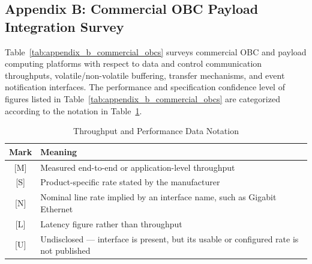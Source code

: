 \documentclass[10pt]{../datasheet}
\begin{document}
\begin{landscape}
  \section{Appendix B: Commercial OBC Payload Integration Survey}
  \makeatletter
  \def\@currentlabel{B}
  \makeatother
  \label{sec:appendix_b}

  Table~\ref{tab:appendix_b_commercial_obcs} surveys commercial OBC and payload computing platforms with respect to data and control communication throughputs, volatile/non-volatile buffering, transfer mechanisms, and event notification interfaces. The performance and specification confidence level of figures listed in Table~\ref{tab:appendix_b_commercial_obcs} are categorized according to the notation in Table~\ref{tab:appendix_b_notation}.

  \begin{table}[h!]
    \centering
    \caption{Throughput and Performance Data Notation}
    \label{tab:appendix_b_notation}
    \renewcommand{\arraystretch}{1.1}
    \begin{tabular}{|c|l|}
      \hline
      \textbf{Mark} & \textbf{Meaning}
      \\ \hline
      {[}M{]}       & Measured end-to-end or application-level throughput                                      \\
      \hline
      {[}S{]}       & Product-specific rate stated by the manufacturer
      \\ \hline
      {[}N{]}       & Nominal line rate implied by an interface name, such as
      Gigabit Ethernet                                                                                         \\ \hline
      {[}L{]}       & Latency figure rather than throughput
      \\ \hline
      {[}U{]}       & Undisclosed --- interface is present, but its usable or configured rate is not published
      \\ \hline
    \end{tabular}
  \end{table}

  \vspace{1em}


\end{landscape}
\end{document}
